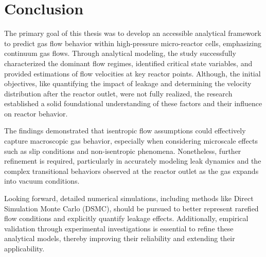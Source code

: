 \section*{Conclusion}
The primary goal of this thesis was to develop an accessible analytical framework to predict gas flow behavior within high-pressure micro-reactor cells, emphasizing continuum gas flows.
Through analytical modeling, the study successfully characterized the dominant flow regimes, identified critical state variables, and provided estimations of flow velocities at key reactor points.
Although, the initial objectives, like quantifying the impact of leakage and determining the velocity distribution after the reactor outlet, were not fully realized, the research established a solid foundational understanding of these factors and their influence on reactor behavior.

The findings demonstrated that isentropic flow assumptions could effectively capture macroscopic gas behavior, especially when considering microscale effects such as slip conditions and non-isentropic phenomena.
Nonetheless, further refinement is required, particularly in accurately modeling leak dynamics and the complex transitional behaviors observed at the reactor outlet as the gas expands into vacuum conditions.

Looking forward, detailed numerical simulations, including methods like Direct Simulation Monte Carlo (DSMC), should be pursued to better represent rarefied flow conditions and explicitly quantify leakage effects.
Additionally, empirical validation through experimental investigations is essential to refine these analytical models, thereby improving their reliability and extending their applicability.
